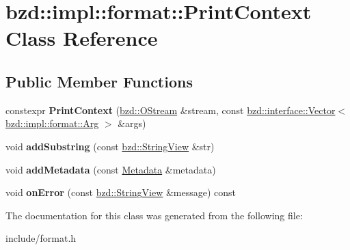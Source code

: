 \hypertarget{classbzd_1_1impl_1_1format_1_1PrintContext}{}\section{bzd\+:\+:impl\+:\+:format\+:\+:Print\+Context Class Reference}
\label{classbzd_1_1impl_1_1format_1_1PrintContext}
\subsection*{Public Member Functions}
\begin{DoxyCompactItemize}
\item 
\mbox{\label{classbzd_1_1impl_1_1format_1_1PrintContext_a9920fc572a2c540c4de7f4bd979c264a}} 
constexpr {\bfseries Print\+Context} (\hyperlink{classbzd_1_1impl_1_1OStream}{bzd\+::\+O\+Stream} \&stream, const \hyperlink{classbzd_1_1impl_1_1Vector}{bzd\+::interface\+::\+Vector}$<$ \hyperlink{classbzd_1_1VariantConstexpr}{bzd\+::impl\+::format\+::\+Arg} $>$ \&args)
\item 
\mbox{\label{classbzd_1_1impl_1_1format_1_1PrintContext_add45b012bad789e01bac4c64d37357a3}} 
void {\bfseries add\+Substring} (const \hyperlink{classbzd_1_1impl_1_1StringView}{bzd\+::\+String\+View} \&str)
\item 
\mbox{\label{classbzd_1_1impl_1_1format_1_1PrintContext_a3e5b759de7473957356b72fd4163568f}} 
void {\bfseries add\+Metadata} (const \hyperlink{structbzd_1_1impl_1_1format_1_1Metadata}{Metadata} \&metadata)
\item 
\mbox{\label{classbzd_1_1impl_1_1format_1_1PrintContext_abe9eda86713670a5aa31eeec0e145adc}} 
void {\bfseries on\+Error} (const \hyperlink{classbzd_1_1impl_1_1StringView}{bzd\+::\+String\+View} \&message) const
\end{DoxyCompactItemize}


The documentation for this class was generated from the following file\+:\begin{DoxyCompactItemize}
\item 
include/format.\+h\end{DoxyCompactItemize}
